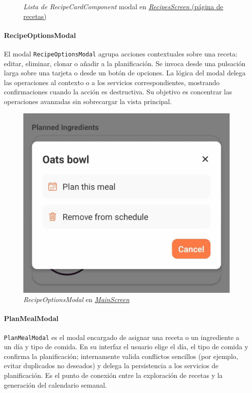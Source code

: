 \documentclass[twoside, openright, 11pt]{report}
\begin{document}
\begin{figure}[H]
						\caption{\textit{Lista de \textit{RecipeCardComponent}} modal en \hyperref[fig:RecipesScreen]{\textit{RecipesScreen} (página de recetas)}}
						\label{fig:RecipeCardComponent}
					\end{figure}

				\paragraph{RecipeOptionsModal\\}
					El modal \texttt{RecipeOptionsModal} agrupa acciones contextuales sobre una receta: editar, eliminar, clonar o añadir a la planificación. Se invoca desde una pulsación larga sobre una tarjeta o desde un botón de opciones. La lógica del modal delega las operaciones al contexto o a los servicios correspondientes, mostrando confirmaciones cuando la acción es destructiva. Su objetivo es concentrar las operaciones avanzadas sin sobrecargar la vista principal.
						
					\begin{figure}[H]
						\centering
						\includegraphics[scale=0.2]{imagenes/RecipeOptionsModal.jpeg}
						\caption{\textit{RecipeOptionsModal} en \hyperref[fig:MainScreen]{\textit{MainScreen}}}
						\label{fig:RecipeOptionsModal}
					\end{figure}

				\paragraph{PlanMealModal\\}
					\texttt{PlanMealModal} es el modal encargado de asignar una receta o un ingrediente a un día y tipo de comida. En su interfaz el usuario elige el día, el tipo de comida y confirma la planificación; internamente valida conflictos sencillos (por ejemplo, evitar duplicados no deseados) y delega la persistencia a los servicios de planificación. Es el punto de conexión entre la exploración de recetas y la generación del calendario semanal.
						
\end{document}
